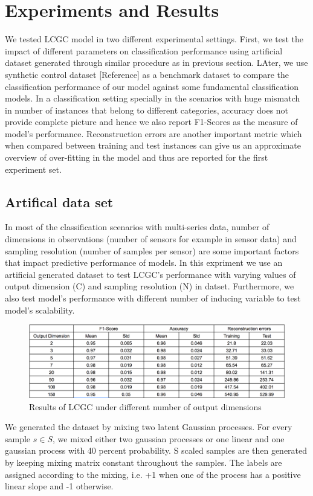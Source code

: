 \section{Experiments and Results}

We tested LCGC model in two different experimental settings. First, we test the impact of different parameters on classification performance using  artificial dataset generated through similar procedure as in previous section. LAter, we use  synthetic control dataset [Reference]  as a benchmark dataset to compare the classification performance of our model against some fundamental classification models.
In a classification setting specially in the scenarios with huge mismatch in number of instances that belong to different categories, accuracy does not provide complete picture and hence we also report F1-Scores as the measure of model’s performance. Reconstruction errors are another important metric which when compared between training and test instances can give us an approximate overview of  over-fitting in the model and thus are reported for the first experiment set. 

\subsection{Artifical data set}

In most of the classification scenarios with multi-series data, number of dimensions in observations (number of sensors for example in sensor data) and sampling resolution (number of samples per sensor) are some important factors that impact predictive performance of models. In this expriment we use an artificial generated dataset to test LCGC's performance  with varying values of output dimension (C) and sampling resolution (N) in datset. Furthermore, we also test model's performance with different number of inducing variable to test model's scalability.
\begin{figure}
    \centering
    \includegraphics[scale=0.35]{thesis/images/LCGC_output_dimension_results.png}
    \caption{Results of LCGC under different number of output dimensions}
    \label{fig:lcpc_results_C}
\end{figure}
We generated the dataset by mixing two latent  Gaussian processes. For every sample $s \in S$, we mixed either two gaussian processes or one linear and one gaussian process with 40 percent probability. S scaled samples are then generated  by keeping mixing matrix constant throughout the samples. The labels are assigned according to the mixing, i.e. +1 when one of the process has a positive linear slope and  -1 otherwise.

